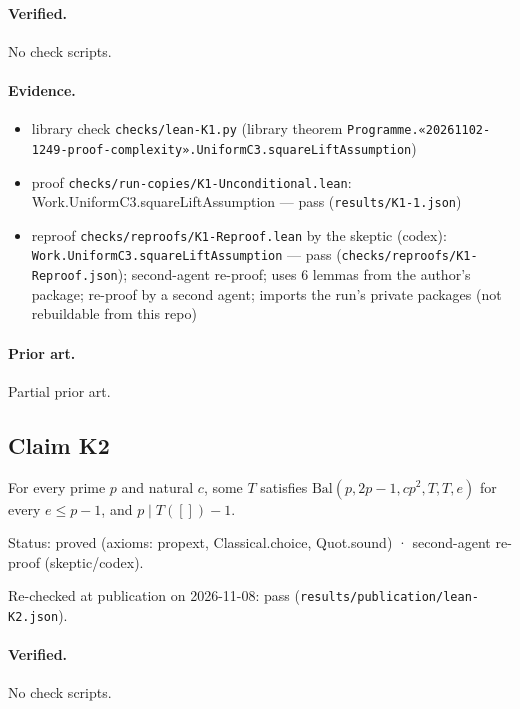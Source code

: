 \documentclass{article}
\begin{document}
\paragraph{Verified.}
No check scripts.

\paragraph{Evidence.}
\begin{itemize}
\item library check \texttt{checks/lean-K1.py} (library theorem \texttt{Programme.«20261102-1249-proof-complexity».UniformC3.squareLiftAssumption})
\item proof \texttt{checks/run-copies/K1-Unconditional.lean}: Work.UniformC3.squareLiftAssumption --- pass (\texttt{results/K1-1.json})
\item reproof \texttt{checks/reproofs/K1-Reproof.lean} by the skeptic (codex): \texttt{Work.UniformC3.squareLiftAssumption} --- pass (\texttt{checks/reproofs/K1-Reproof.json}); second-agent re-proof; uses 6 lemmas from the author's package; re-proof by a second agent; imports the run's private packages (not rebuildable from this repo)
\end{itemize}

\paragraph{Prior art.} Partial prior art.

\subsection*{Claim K2}

For every prime $p$ and natural $c$, some $T$ satisfies $\mathrm{Bal}(p,2p-1,cp^2,T,T,e)$ for every $e\le p-1$, and $p\mid T([])-1$.

Status: proved (axioms: propext, Classical.choice, Quot.sound) · second-agent re-proof (skeptic/codex).

Re-checked at publication on 2026-11-08: pass (\texttt{results/publication/lean-K2.json}).

\paragraph{Verified.}
No check scripts.
\end{document}

